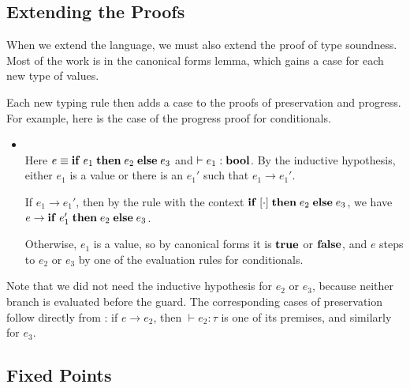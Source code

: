 \subsection{Extending the Proofs}

When we extend the language, we must also extend the proof of type soundness. Most of the work is in the canonical forms lemma, which gains a case for each new type of values.


Each new typing rule then adds a case to the proofs of preservation and progress. For example, here is the case of the progress proof for conditionals.
\begin{itemize}
\item {}\\
Here $e \equiv \mathbf{if}\; e_1\; \mathbf{then}\; e_2\; \mathbf{else}\; e_3$ and $\vdash e_1 : \mathbf{bool}$. By the inductive hypothesis, either $e_1$ is a value or there is an $e_1'$ such that $e_1 \to e_1'$.

If $e_1 \to e_1'$, then by the  rule with the context $\mathbf{if}\; [\cdot]\; \mathbf{then}\; e_2\; \mathbf{else}\; e_3$, we have $e \to \mathbf{if}\; e_1'\; \mathbf{then}\; e_2\; \mathbf{else}\; e_3$.

Otherwise, $e_1$ is a value, so by canonical forms it is $\mathbf{true}$ or $\mathbf{false}$, and $e$ steps to $e_2$ or $e_3$ by one of the evaluation rules for conditionals.
\end{itemize}
Note that we did not need the inductive hypothesis for $e_2$ or $e_3$, because neither branch is evaluated before the guard. The corresponding cases of preservation follow directly from : if $e \to e_2$, then $\vdash e_2 : \tau$ is one of its premises, and similarly for $e_3$.

\subsection{Fixed Points}

